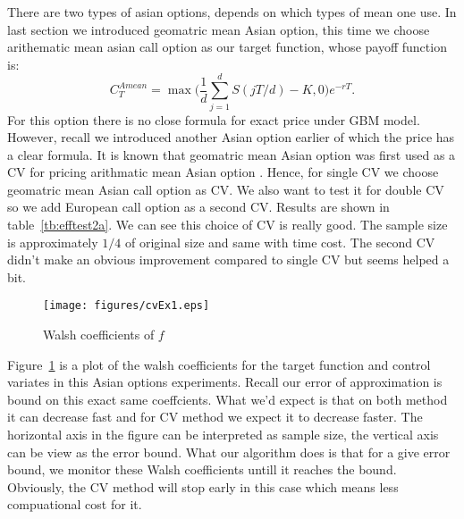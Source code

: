 There are two types of asian options, depends on which types of mean one use. 
In last section we introduced geomatric mean Asian option, this time we choose arithematic mean asian call option as our target function, whose payoff function is:
\[ C_{T}^{Amean} = \max\Big(\frac{1}{d}\sum_{j=1}^{d}S(jT/d)-K, 0\Big)e^{-rT}.\]
For this option there is no close formula for exact price under GBM model.
However, recall we introduced another Asian option earlier of which the price has a clear formula. 
It is known that geomatric mean Asian option was first used as a CV for pricing arithmatic mean Asian option \cite{kemna1990pricing}. 
Hence, for single CV we choose geomatric mean Asian call option as CV. 
We also want to test it for double CV so we add European call option as a second CV. 
Results are shown in table~\ref{tb:efftest2a}. We can see this choice of CV is really good. 
The sample size is approximately $1/4$ of original size and same with time cost. 
The second CV didn't make an obvious improvement compared to single CV but seems helped a bit.    

\begin{figure}[h]
    \centering
    \texttt{[image: figures/cvEx1.eps]}
    \caption{Walsh coefficients of $f$}
    \label{fg:cvEX1}
\end{figure}

Figure~\ref{fg:cvEX1} is a plot of the walsh coefficients for the target function and control variates in this Asian options experiments. Recall our error of approximation is bound on this exact same coeffcients. 
What we'd expect is that on both method it can decrease fast and for CV method we expect it to decrease faster.   
The horizontal axis in the figure can be interpreted as sample size, the vertical axis can be view as the error bound. What our algorithm does is that for a give error bound, we monitor these Walsh coefficients untill it reaches the bound. Obviously, the CV method will stop early in this case which means less compuational cost for it. 

